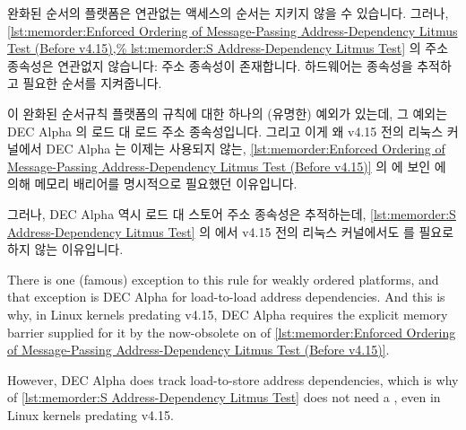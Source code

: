 {{\fi

	완화된 순서의 플랫폼은 연관없는 액세스의 순서는 지키지 않을 수
	있습니다.
	그러나,
	\cref{lst:memorder:Enforced Ordering of Message-Passing Address-Dependency Litmus Test (Before v4.15),%
	lst:memorder:S Address-Dependency Litmus Test}
	의 주소 종속성은 연관없지 않습니다: 주소 종속성이 존재합니다.
	하드웨어는 종속성을 추적하고 필요한 순서를 지켜줍니다.

	\begin{fcvref}
	이 완화된 순서규칙 플랫폼의 규칙에 대한 하나의 (유명한) 예외가 있는데,
	그 예외는 DEC Alpha 의 로드 대 로드 주소 종속성입니다.
	그리고 이게 왜 v4.15 전의 리눅스 커널에서 DEC Alpha 는 이제는 사용되지 않는,
	\cref{lst:memorder:Enforced Ordering of Message-Passing Address-Dependency Litmus Test (Before v4.15)}
	의  에 보인  에 의해 메모리
	배리어를 명시적으로 필요했던 이유입니다.
	\end{fcvref}
	\begin{fcvref}
	그러나, DEC Alpha 역시 로드 대 스토어 주소 종속성은 추적하는데,
	\cref{lst:memorder:S Address-Dependency Litmus Test}
	의  에서 v4.15 전의 리눅스 커널에서도
	 를 필요로 하지 않는 이유입니다.
	\end{fcvref}

	\iffalse

	\begin{fcvref}
	There is one (famous) exception to this rule for weakly ordered
	platforms, and that exception is DEC Alpha for load-to-load
	address dependencies.
	And this is why, in Linux kernels predating v4.15, DEC Alpha
	requires the explicit memory barrier supplied for it by the
	now-obsolete  on  of
	\cref{lst:memorder:Enforced Ordering of Message-Passing Address-Dependency Litmus Test (Before v4.15)}.
	\end{fcvref}
	\begin{fcvref}
	However, DEC Alpha does track load-to-store address dependencies,
	which is why  of
	\cref{lst:memorder:S Address-Dependency Litmus Test}
	does not need a , even in Linux
	kernels predating v4.15.
	\end{fcvref}

}}
